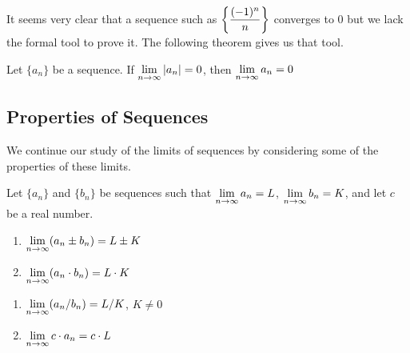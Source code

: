 


It seems very clear that a sequence such as $\displaystyle \left\{\frac{(-1)^n}{n}\right\}$ converges to 0 but we lack the formal tool to prove it. The following theorem gives us that tool.

{Let $\{a_n\}$ be a sequence. If $\displaystyle \lim_{n\to\infty} |a_n| = 0$, then $\displaystyle \lim_{n\to\infty} a_n = 0$
} %



\subsection*{Properties of Sequences} %

We continue our study of the limits of sequences by considering some of the properties of these limits.

{Let $\{a_n\}$ and $\{b_n\}$ be sequences such that $\displaystyle \lim_{n\to\infty} a_n = L$, $\displaystyle \lim_{n\to\infty} b_n = K$, and let $c$ be a real number.

\begin{minipage}[t]{.5\linewidth}
\begin{enumerate}
\item		$\displaystyle \lim_{n\to\infty} (a_n\pm b_n) = L\pm K$
\item		$\displaystyle \lim_{n\to\infty} (a_n\cdot b_n) = L\cdot K$
\end{enumerate}
\end{minipage}
\begin{minipage}[t]{.5\linewidth}
\begin{enumerate}\addtocounter{enumi}{2}
\item		$\displaystyle \lim_{n\to\infty} (a_n/b_n) = L/K$, $K\neq 0$
\item		$\displaystyle \lim_{n\to\infty} c\cdot a_n = c\cdot L$
\end{enumerate}
\end{minipage}
} %





